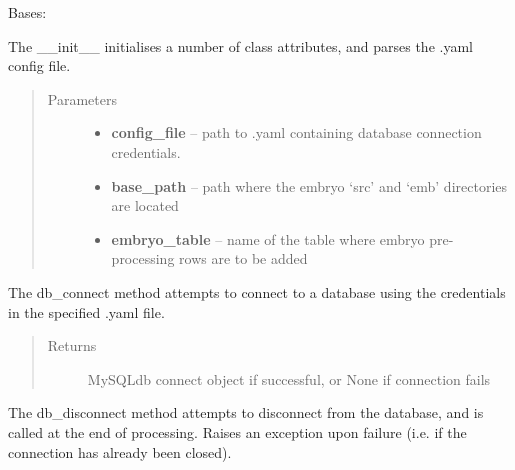 \documentclass[letterpaper,10pt,english]{sphinxmanual}
\begin{document}
\begin{fulllineitems}
\label{EmbryoPreprocess:EmbryoPreprocess.EmbryoPreprocess}
Bases: 

The \_\_init\_\_ initialises a number of class attributes, and parses the .yaml config file.
\begin{quote}\begin{description}
\item[{Parameters}] \leavevmode\begin{itemize}
\item {} 
\textbf{config\_file} -- path to .yaml containing database connection credentials.

\item {} 
\textbf{base\_path} -- path where the embryo `src' and `emb' directories are located

\item {} 
\textbf{embryo\_table} -- name of the table where embryo pre-processing rows are to be added

\end{itemize}

\end{description}\end{quote}

\begin{fulllineitems}
\label{EmbryoPreprocess:EmbryoPreprocess.EmbryoPreprocess.db_connect}
The db\_connect method attempts to connect to a database using the credentials in the specified .yaml file.
\begin{quote}\begin{description}
\item[{Returns}] \leavevmode
MySQLdb connect object if successful, or None if connection fails

\end{description}\end{quote}

\end{fulllineitems}


\begin{fulllineitems}
\label{EmbryoPreprocess:EmbryoPreprocess.EmbryoPreprocess.db_disconnect}
The db\_disconnect method attempts to disconnect from the database, and is called at the end of processing.
Raises an exception upon failure (i.e. if the connection has already been closed).


\end{fulllineitems}
\end{fulllineitems}
\end{document}
